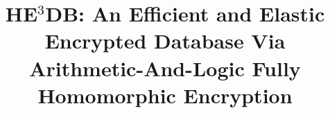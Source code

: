 \documentclass[sigconf, anonymous,review]{acmart}
\newcommand{\NAME}{HE$^3$DB\xspace}
\begin{document}
\title[\NAME: An Efficient Encrypted Database via Fully Homomorphic Encryption]{\NAME: An Efficient and Elastic Encrypted Database Via
Arithmetic-And-Logic Fully Homomorphic Encryption}


\sloppy

\maketitle

\clearpage



\end{document}
